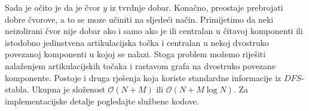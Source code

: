 Sada je očito je da je čvor $y$ iz tvrdnje dobar. Konačno, preostaje prebrojati dobre čvorove, a to se moze učiniti na sljedeći način. Primijetimo da neki neizolirani čvor nije dobar ako i samo ako je ili centralan u čitavoj komponenti ili istodobno jedinstvena artikulacijska točka i centralan u nekoj dvostruko povezanoj komponenti u kojoj se nalazi. Stoga problem možemo riješiti nalaženjem artikulacijskih točaka i rastavom grafa na dvostruko povezane komponente. Postoje i druga rješenja koja koriste standardne informacije iz $DFS$-stabla. Ukupna je složenost $\mathcal{O}(N + M)$ ili $\mathcal{O}(N + M\log N)$. Za implementacijske detalje pogledajte službene kodove.
